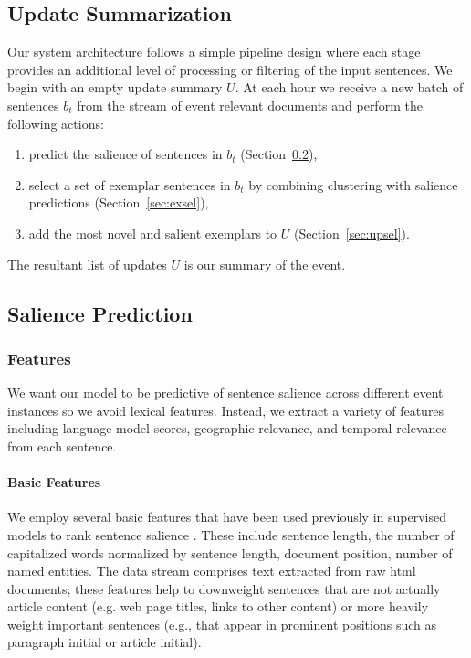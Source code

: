 \subsection{Update Summarization}

Our system architecture follows a simple pipeline design where each
stage provides an additional level of processing or filtering of the input
sentences.
We begin with an empty update summary $U$.
At each hour we receive a new batch of sentences $b_t$ from the stream
of event relevant documents
and perform the following actions:
\begin{enumerate}[nosep]
  \item predict the salience of sentences in $b_t$ (Section~\ref{sec:salpred}),
  \item select a set of exemplar sentences in $b_t$ by combining 
      clustering with 
      salience predictions (Section~\ref{sec:exsel}),
  \item add the most novel and salient exemplars 
      to $U$ (Section~\ref{sec:upsel}).
\end{enumerate}
The resultant list of updates $U$ is our summary of the event.


\subsection{Salience Prediction}
\label{sec:salpred}

%

\subsubsection{Features}
\label{sec:features}
We want our model to be predictive of sentence salience across different event instances so we avoid lexical features.  Instead, we extract a variety of features including language model scores, geographic relevance, and temporal relevance from each sentence.  

\paragraph{Basic Features}
We employ several basic features that have been used previously in supervised models to rank sentence salience \cite{kupiec1995trainable,conroy2001using}. These include sentence length, the number of capitalized words normalized by sentence length, document position, number of named entities.  
The data stream comprises text extracted from raw html documents;
these features help to downweight sentences that are not actually article 
content (e.g. web page titles, links to other content) or
more heavily weight important sentences (e.g., that appear in
prominent positions such as paragraph initial or article initial).

